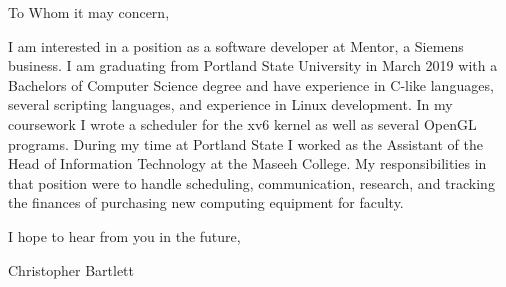 \documentclass{resume} %
\begin{document}
\vspace{0.50 in}

To Whom it may concern,

\vspace{0.50 in}

\quad I am interested in a position as a software developer at Mentor, a Siemens business. I am graduating from Portland State University in March 2019 with a Bachelors of Computer Science degree and have experience in C-like languages, several scripting languages, and experience in Linux development. In my coursework I wrote a scheduler for the xv6 kernel as well as several OpenGL programs. During my time at Portland State I worked as the Assistant of the Head of Information Technology at the Maseeh College. My responsibilities in that position were to handle scheduling, communication, research, and tracking the finances of purchasing new computing equipment for faculty.

\vspace{0.50 in}

I hope to hear from you in the future, 


\quad Christopher Bartlett



\end{document}
